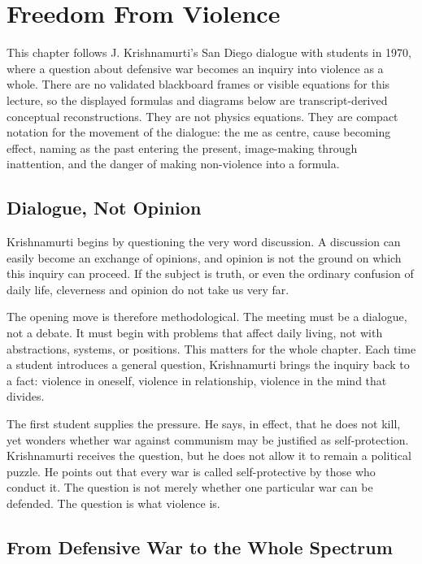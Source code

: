\chapter{Freedom From Violence}

This chapter follows J. Krishnamurti's San Diego dialogue with students in 1970, where a question about defensive war becomes an inquiry into violence as a whole. There are no validated blackboard frames or visible equations for this lecture, so the displayed formulas and diagrams below are transcript-derived conceptual reconstructions. They are not physics equations. They are compact notation for the movement of the dialogue: the me as centre, cause becoming effect, naming as the past entering the present, image-making through inattention, and the danger of making non-violence into a formula.

\section{Dialogue, Not Opinion}

Krishnamurti begins by questioning the very word discussion. A discussion can easily become an exchange of opinions, and opinion is not the ground on which this inquiry can proceed. If the subject is truth, or even the ordinary confusion of daily life, cleverness and opinion do not take us very far.

The opening move is therefore methodological. The meeting must be a dialogue, not a debate. It must begin with problems that affect daily living, not with abstractions, systems, or positions. This matters for the whole chapter. Each time a student introduces a general question, Krishnamurti brings the inquiry back to a fact: violence in oneself, violence in relationship, violence in the mind that divides.

The first student supplies the pressure. He says, in effect, that he does not kill, yet wonders whether war against communism may be justified as self-protection. Krishnamurti receives the question, but he does not allow it to remain a political puzzle. He points out that every war is called self-protective by those who conduct it. The question is not merely whether one particular war can be defended. The question is what violence is.

\section{From Defensive War to the Whole Spectrum}

